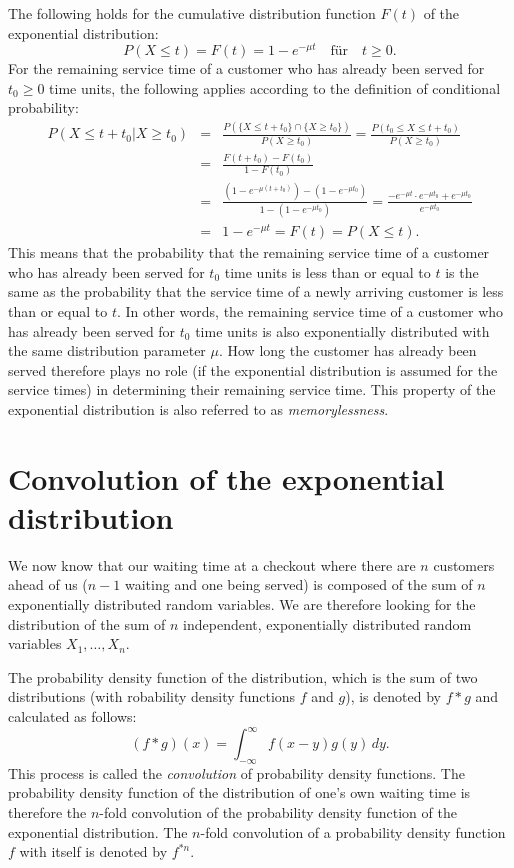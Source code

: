 \documentclass[a4paper,11pt,oneside]{article}
\begin{document}
The following holds for the cumulative distribution function $F(t)$ of the exponential distribution:
$$
P(X\le t)=F(t)=1-e^{-\mu t} \quad\text{für}\quad t\geq0.
$$
For the remaining service time of a customer who has already been served for $t_0\ge0$ time units, the following applies according to the definition of conditional probability:
\begin{eqnarray*}
P(X\le t+t_0|X\ge t_0)
&=&\frac{P(\{X\le t+t_0\}\cap \{X\ge t_0\})}{P(X\ge t_0)}
 = \frac{P(t_0\le X\le t+t_0)}{P(X\ge t_0)}\\
&=&\frac{F(t+t_0)-F(t_0)}{1-F(t_0)}\\
&=&\frac{(1-e^{-\mu(t+t_0)})-(1-e^{-\mu t_0})}{1-(1-e^{-\mu t_0})}
 = \frac{-e^{-\mu t}\cdot e^{-\mu t_0}+e^{-\mu t_0}}{e^{-\mu t_0}}\\
&=&1-e^{-\mu t}
 = F(t)=P(X\le t).
\end{eqnarray*}
This means that the probability that the remaining service time of a customer who has already been served for $t_0$ time units is less than or equal to $t$ is the same as the probability that the service time of a newly arriving customer is less than or equal to $t$. In other words, the remaining service time of a customer who has already been served for $t_0$ time units is also exponentially distributed with the same distribution parameter $\mu$. How long the customer has already been served therefore plays no role (if the exponential distribution is assumed for the service times) in determining their remaining service time. This property of the exponential distribution is also referred to as \emph{memorylessness}.



\section{Convolution of the exponential distribution}

We now know that our waiting time at a checkout where there are $n$ customers ahead of us ($n-1$ waiting and one being served) is composed of the sum of $n$ exponentially distributed random variables. We are therefore looking for the distribution of the sum of $n$ independent, exponentially distributed random variables $X_1,\ldots,X_n$.

The probability density function of the distribution, which is the sum of two distributions (with robability density functions $f$ and $g$), is denoted by $f*g$ and calculated as follows:
$$
(f*g)(x)=\int_{-\infty}^{\infty} f(x-y)g(y)\,dy.
$$
This process is called the \emph{convolution} of probability density functions. The probability density function of the distribution of one's own waiting time is therefore the $n$-fold convolution of the probability density function of the exponential distribution. The $n$-fold convolution of a probability density function $f$ with itself is denoted by $f^{*n}$.
\end{document}
